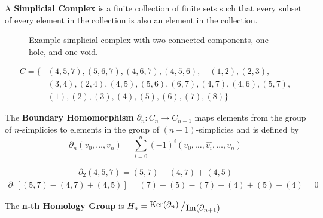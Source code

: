 \begin{frame}
	\begin{definition}
		A \textbf{Simplicial Complex} is a finite collection of finite sets such that every subset of every element in the collection is also an element in the collection. \cite{wagner}
	\end{definition}
	\begin{figure}
		
		\caption{Example simplicial complex with two connected components, one hole, and one void.}
	\end{figure}
	\begin{align*}
		C = \{
			&(4,5,7), (5,6,7), (4,6,7), (4,5,6),\quad (1,2), (2,3),\\ &(3,4), (2,4), (4,5), (5,6),(6,7),(4,7),(4,6),(5,7),\\
			&(1), (2), (3), (4), (5), (6), (7), (8)
		\}
	\end{align*}
\end{frame}

\begin{frame}
	\begin{definition}
		The \textbf{Boundary Homomorphism} \(\partial_n : C_n \to C_{n-1}\) maps elements from the group of \(n\)-simplicies to elements in the group of \((n-1)\)-simplicies and is defined by
		\[
			\partial_n (v_0,\dots , v_{n}) = \sum_{i=0}^n (-1)^{i}
			(v_0,\dots, \widehat{v_i}, \dots, v_n)
		\]
		\cite{hatcher}
	\end{definition}
	\begin{align*}
		\partial_2 (4,5,7) = (5,7) - (4,7) + (4,5)
	\end{align*}
	\begin{align*}
		\partial_1 [(5,7) - (4,7) + (4,5)] = (7) - (5) - (7) + (4) + (5) - (4) = 0
	\end{align*}
\end{frame}

\begin{frame}
	\begin{definition}
		The \textbf{n-th Homology Group} is \(H_n = \bigslant{\Ker(\partial_n)}{\Ima(\partial_{n+1})}\)
		\cite{fraleigha}
	\end{definition}
	\vspace{1em}
	\begin{figure}
		\scalebox{.8}{
			
		}
	\end{figure}
\end{frame}

